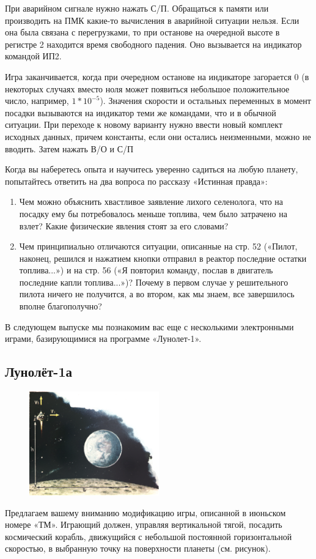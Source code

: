 \documentclass[11pt,a4paper,oneside]{article}
\begin{document}
При аварийном сигнале нужно нажать С/П. Обращаться к памяти или производить на ПМК какие-то вычисления в аварийной ситуации нельзя. Если она была связана с перегрузками, то при останове на очередной высоте в регистре 2 находится время свободного падения. Оно вызывается на индикатор командой ИП2.

Игра заканчивается, когда при очередном останове на индикаторе загорается 0 (в некоторых случаях вместо ноля может появиться небольшое положительное число, например, $1 * 10^{-5}$). Значения скорости и остальных переменных в момент посадки вызываются на индикатор теми же командами, что и в обычной ситуации. При переходе к новому варианту нужно ввести новый комплект исходных данных, причем константы, если они остались неизменными, можно не вводить. Затем нажать В/О и С/П

Когда вы наберетесь опыта и научитесь уверенно садиться на любую планету, попытайтесь ответить на два вопроса по рассказу «Истинная правда»:

\begin{enumerate}
\item Чем можно объяснить хвастливое заявление лихого селенолога, что на посадку ему бы потребовалось меньше топлива, чем было затрачено на взлет? Какие физические явления стоят за его словами?
\item Чем принципиально отличаются ситуации, описанные на стр. 52 («Пилот, наконец, решился и нажатием кнопки отправил в реактор последние остатки топлива...») и на стр. 56 («Я повторил команду, послав в двигатель последние капли топлива...»)? Почему в первом случае у решительного пилота ничего не получится, а во втором, как мы знаем, все завершилось вполне благополучно?
\end{enumerate}

В следующем выпуске мы познакомим вас еще с несколькими электронными играми, базирующимися на программе «Лунолет-1».

\subsection{Лунолёт-1а}

\begin{figure}
\includegraphics[width=0.5\textwidth]{soft_land1}
\end{figure}
Предлагаем вашему вниманию модификацию игры, описанной в июньском номере «ТМ». Играющий должен, управляя вертикальной тягой, посадить космический корабль, движущийся с небольшой постоянной горизонтальной скоростью, в выбранную точку на поверхности планеты (см. рисунок).
\end{document}
